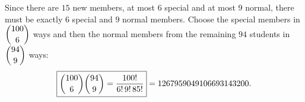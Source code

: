 Since there are $15$ new members, at most $6$ special and at most $9$ normal, there must be exactly $6$ special and $9$ normal members. Choose the special members in $\dbinom{100}{6}$ ways and then the normal members from the remaining $94$ students in $\dbinom{94}{9}$ ways:
\[\boxed{\dbinom{100}{6}\dbinom{94}{9}=\dfrac{100!}{6!\,9!\,85!}}=1267959049106693143200.\]
